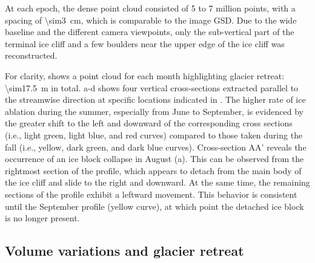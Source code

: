 At each epoch, the dense point cloud consisted of 5 to 7 million points,
with a spacing of \SI{\sim3}{\centi\meter}, which is comparable to the image GSD.
Due to the wide baseline and the different camera viewpoints, only the
sub-vertical part of the terminal ice cliff and a few boulders near the upper
edge of the ice cliff was reconstructed.

For clarity,  shows a point cloud for each month
highlighting glacier retreat: \SI{\sim17.5}{\meter} in total.
a-d shows four vertical cross-sections extracted
parallel to the streamwise direction at specific locations indicated in
.
The higher rate of ice ablation during the summer, especially from June to September, is evidenced by the greater shift to the left and downward of the corresponding cross sections (i.e., light green, light blue, and red curves) compared to those taken during the fall (i.e., yellow, dark green, and dark blue curves).
Cross-section AA' reveals the occurrence of an ice block collapse in August
(a).
This can be observed from the rightmost section of the profile, which appears to detach from the main body of the ice cliff and slide to the right and downward.
At the same time, the remaining sections of the profile exhibit a leftward movement.
This behavior is consistent until the September profile (yellow
curve), at which point the detached ice block is no longer present.

\subsection{Volume variations and glacier retreat}\label{sec:4:res_volumes_retreat}

